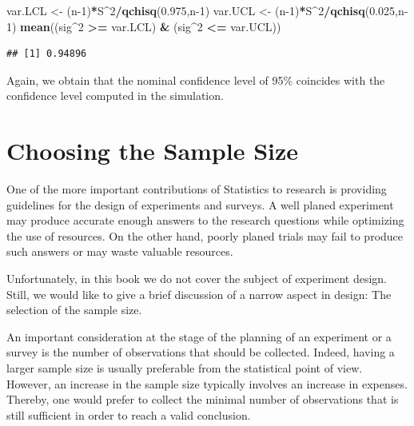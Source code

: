\documentclass[
]{krantz}
\makeatletter
\newenvironment{Shaded}{\begin{snugshade}}{\end{snugshade}}
\newcommand{\DecValTok}[1]{\textcolor[rgb]{0.00,0.00,0.81}{#1}}
\newcommand{\FloatTok}[1]{\textcolor[rgb]{0.00,0.00,0.81}{#1}}
\newcommand{\KeywordTok}[1]{\textcolor[rgb]{0.13,0.29,0.53}{\textbf{#1}}}
\newcommand{\NormalTok}[1]{#1}
\newcommand{\OperatorTok}[1]{\textcolor[rgb]{0.81,0.36,0.00}{\textbf{#1}}}
\newcommand{\StringTok}[1]{\textcolor[rgb]{0.31,0.60,0.02}{#1}}
\newenvironment{kframe}{%
\medskip{}
\setlength{\fboxsep}{.8em}
 \def\at@end@of@kframe{}%
 \ifinner\ifhmode%
  \def\at@end@of@kframe{\end{minipage}}%
  \begin{minipage}{\columnwidth}%
 \fi\fi%
 \def\FrameCommand##1{\hskip\@totalleftmargin \hskip-\fboxsep
 \colorbox{shadecolor}{##1}\hskip-\fboxsep
     \hskip-\linewidth \hskip-\@totalleftmargin \hskip\columnwidth}%
 \MakeFramed {\advance\hsize-\width
   \@totalleftmargin\z@ \linewidth\hsize
   \@setminipage}}%
 {\par\unskip\endMakeFramed%
 \at@end@of@kframe}
\renewenvironment{Shaded}{\begin{kframe}}{\end{kframe}}
\theoremstyle{definition}
\theoremstyle{definition}
\theoremstyle{definition}
\theoremstyle{remark}
\makeatother
\begin{document}
\begin{Shaded}
\begin{Highlighting}[]
\NormalTok{var.LCL <-}\StringTok{ }\NormalTok{(n}\DecValTok{-1}\NormalTok{)}\OperatorTok{*}\NormalTok{S}\OperatorTok{^}\DecValTok{2}\OperatorTok{/}\KeywordTok{qchisq}\NormalTok{(}\FloatTok{0.975}\NormalTok{,n}\DecValTok{-1}\NormalTok{)}
\NormalTok{var.UCL <-}\StringTok{ }\NormalTok{(n}\DecValTok{-1}\NormalTok{)}\OperatorTok{*}\NormalTok{S}\OperatorTok{^}\DecValTok{2}\OperatorTok{/}\KeywordTok{qchisq}\NormalTok{(}\FloatTok{0.025}\NormalTok{,n}\DecValTok{-1}\NormalTok{)}
\KeywordTok{mean}\NormalTok{((sig}\OperatorTok{^}\DecValTok{2} \OperatorTok{>=}\StringTok{ }\NormalTok{var.LCL) }\OperatorTok{&}\StringTok{ }\NormalTok{(sig}\OperatorTok{^}\DecValTok{2} \OperatorTok{<=}\StringTok{ }\NormalTok{var.UCL))}
\end{Highlighting}
\end{Shaded}

\begin{verbatim}
## [1] 0.94896
\end{verbatim}

Again, we obtain that the nominal confidence level of 95\% coincides with
the confidence level computed in the simulation.

\hypertarget{choosing-the-sample-size}{%
\section{Choosing the Sample Size}\label{choosing-the-sample-size}}

One of the more important contributions of Statistics to research is
providing guidelines for the design of experiments and surveys. A well
planed experiment may produce accurate enough answers to the research
questions while optimizing the use of resources. On the other hand,
poorly planed trials may fail to produce such answers or may waste
valuable resources.

Unfortunately, in this book we do not cover the subject of experiment
design. Still, we would like to give a brief discussion of a narrow
aspect in design: The selection of the sample size.

An important consideration at the stage of the planning of an experiment
or a survey is the number of observations that should be collected.
Indeed, having a larger sample size is usually preferable from the
statistical point of view. However, an increase in the sample size
typically involves an increase in expenses. Thereby, one would prefer to
collect the minimal number of observations that is still sufficient in
order to reach a valid conclusion.
\end{document}
